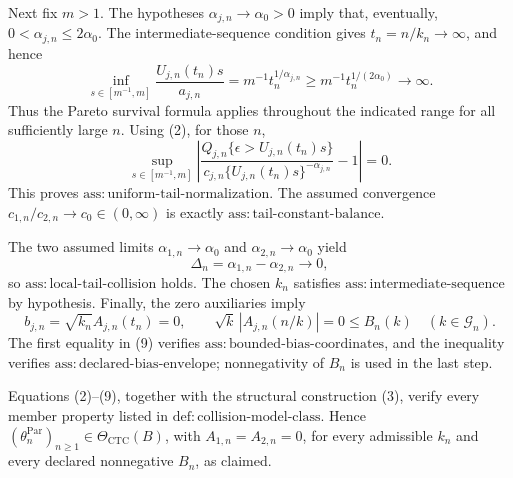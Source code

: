 Next fix \(m>1\).  The hypotheses \(\alpha_{j,n}\to\alpha_0>0\) imply that, eventually, \(0<\alpha_{j,n}\leq2\alpha_0\).  The intermediate-sequence condition gives \(t_n=n/k_n\to\infty\), and hence
\[
 \inf_{s\in[m^{-1},m]}
 \frac{U_{j,n}(t_n)s}{a_{j,n}}
 =m^{-1}t_n^{1/\alpha_{j,n}}
 \geq m^{-1}t_n^{1/(2\alpha_0)}\longrightarrow\infty. \tag{6}
\]
Thus the Pareto survival formula applies throughout the indicated range for all sufficiently large \(n\).  Using (2), for those \(n\),
\[
 \sup_{s\in[m^{-1},m]}
 \left|
 \frac{Q_{j,n}\{\epsilon>U_{j,n}(t_n)s\}}
 {c_{j,n}\{U_{j,n}(t_n)s\}^{-\alpha_{j,n}}}-1
 \right|=0. \tag{7}
\]
This proves \(\mathrm{ass:uniform\text{-}tail\text{-}normalization}\).  The assumed convergence \(c_{1,n}/c_{2,n}\to c_0\in(0,\infty)\) is exactly \(\mathrm{ass:tail\text{-}constant\text{-}balance}\).

The two assumed limits \(\alpha_{1,n}\to\alpha_0\) and \(\alpha_{2,n}\to\alpha_0\) yield
\[
 \Delta_n=\alpha_{1,n}-\alpha_{2,n}\longrightarrow0, \tag{8}
\]
so \(\mathrm{ass:local\text{-}tail\text{-}collision}\) holds.  The chosen \(k_n\) satisfies \(\mathrm{ass:intermediate\text{-}sequence}\) by hypothesis.  Finally, the zero auxiliaries imply
\[
 b_{j,n}=\sqrt{k_n}A_{j,n}(t_n)=0,\qquad
 \sqrt{k}\,|A_{j,n}(n/k)|=0\leq B_n(k)
 \quad(k\in\mathcal G_n). \tag{9}
\]
The first equality in (9) verifies \(\mathrm{ass:bounded\text{-}bias\text{-}coordinates}\), and the inequality verifies \(\mathrm{ass:declared\text{-}bias\text{-}envelope}\); nonnegativity of \(B_n\) is used in the last step.

Equations (2)--(9), together with the structural construction (3), verify every member property listed in \(\mathrm{def:collision\text{-}model\text{-}class}\).  Hence \((\theta_n^{\mathrm{Par}})_{n\geq1}\in\Theta_{\mathrm{CTC}}(B)\), with \(A_{1,n}=A_{2,n}=0\), for every admissible \(k_n\) and every declared nonnegative \(B_n\), as claimed.